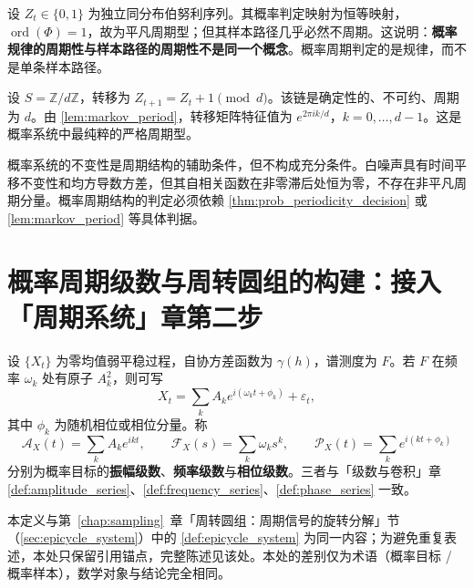 \begin{example}[伯努利链与周期判定]\label{ex:bernoulli_period}
设 $Z_t\in\{0,1\}$ 为独立同分布伯努利序列。其概率判定映射为恒等映射，$\operatorname{ord}(\Phi)=1$，故为平凡周期型；但其样本路径几乎必然不周期。这说明：\textbf{概率规律的周期性与样本路径的周期性不是同一个概念}。概率周期判定的是规律，而不是单条样本路径。
\end{example}

\begin{example}[有限循环马尔可夫链]\label{ex:cyclic_markov}
设 $S=\mathbb Z/d\mathbb Z$，转移为 $Z_{t+1}=Z_t+1\pmod d$。该链是确定性的、不可约、周期为 $d$。由 \cref{lem:markov_period}，转移矩阵特征值为 $e^{2\pi i k/d}$，$k=0,\dots,d-1$。这是概率系统中最纯粹的严格周期型。
\end{example}

\begin{remark}[不变量不保证周期]\label{rem:prob_invariant_not_period}
概率系统的不变性是周期结构的辅助条件，但不构成充分条件。白噪声具有时间平移不变性和均方导数方差，但其自相关函数在非零滞后处恒为零，不存在非平凡周期分量。概率周期结构的判定必须依赖 \cref{thm:prob_periodicity_decision} 或 \cref{lem:markov_period} 等具体判据。
\end{remark}

\section{概率周期级数与周转圆组的构建：接入「周期系统」章第二步}
\label{sec:prob_series_construction}

\begin{definition}\label{def:prob_series}
设 $\{X_t\}$ 为零均值弱平稳过程，自协方差函数为 $\gamma(h)$，谱测度为 $F$。若 $F$ 在频率 $\omega_k$ 处有原子 $A_k^2$，则可写
\[
X_t=\sum_k A_k e^{i(\omega_k t+\phi_k)}+\varepsilon_t,
\]
其中 $\phi_k$ 为随机相位或相位分量。称
\[
\mathcal A_X(t)=\sum_k A_k e^{ikt},\qquad
\mathcal F_X(s)=\sum_k \omega_k s^k,\qquad
\mathcal P_X(t)=\sum_k e^{i(kt+\phi_k)}
\]
分别为概率目标的\textbf{振幅级数}、\textbf{频率级数}与\textbf{相位级数}。三者与「级数与卷积」章 \cref{def:amplitude_series}、\cref{def:frequency_series}、\cref{def:phase_series} 一致。
\end{definition}

\begin{definition}[概率周转圆组]\label{def:prob_epicycle_group}
本定义与第~\ref{chap:sampling}~章「周转圆组：周期信号的旋转分解」节（\cref{sec:epicycle_system}）中的 \cref{def:epicycle_system} 为同一内容；为避免重复表述，本处只保留引用锚点，完整陈述见该处。本处的差别仅为术语（概率目标 / 概率样本），数学对象与结论完全相同。
\end{definition}

